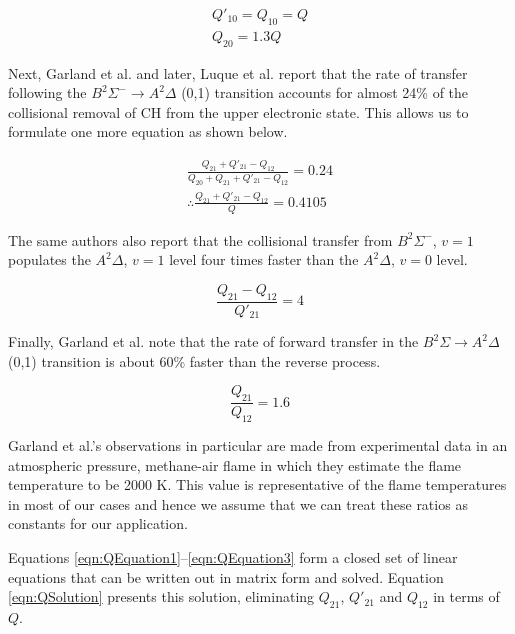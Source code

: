 \begin{gather}
  Q'_{10} = Q_{10} = Q \nonumber \\
  Q_{20} = 1.3 Q
  \label{eqn:quenchingAssumption}
\end{gather}

Next, Garland et al.\cite{1985-garland-b} and later, Luque et al.\cite{2000-luque} report that the rate of transfer following the \(B^2\Sigma^-\rightarrow A^2\Delta\) (0,1) transition accounts for almost 24\% of the collisional removal of CH from the upper electronic state.
This allows us to formulate one more equation as shown below.

\begin{gather}
  \frac{ Q_{21} + Q'_{21} - Q_{12} }{ Q_{20} + Q_{21} + Q'_{21} - Q_{12} } = 0.24 \nonumber \\
  \therefore \frac{ Q_{21} + Q'_{21} - Q_{12} }{ Q } = 0.4105
  \label{eqn:QEquation1}
\end{gather}

The same authors also report that the collisional transfer from \(B^2\Sigma^-\), \(v = 1\) populates the \(A^2\Delta\), \(v = 1\) level four times faster than the \(A^2\Delta\), \(v = 0\) level.

\begin{equation}
  \frac{ Q_{21} - Q_{12} }{ Q'_{21} } = 4
  \label{eqn:QEquation2}
\end{equation}

Finally, Garland et al.\cite{1985-garland-b} note that the rate of forward transfer in the \(B^2\Sigma\rightarrow A^2\Delta\) (0,1) transition is about 60\% faster than the reverse process.

\begin{equation}
  \frac{Q_{21}}{Q_{12}} = 1.6
  \label{eqn:QEquation3}
\end{equation}

Garland et al.'s observations in particular are made from experimental data in an atmospheric pressure, methane-air flame in which they estimate the flame temperature to be 2000 K.
This value is representative of the flame temperatures in most of our cases and hence we assume that we can treat these ratios as constants for our application.

Equations \ref{eqn:QEquation1}--\ref{eqn:QEquation3} form a closed set of linear equations that can be written out in matrix form and solved.
Equation \ref{eqn:QSolution} presents this solution, eliminating \(Q_{21}\), \(Q'_{21}\) and \(Q_{12}\) in terms of \(Q\).

